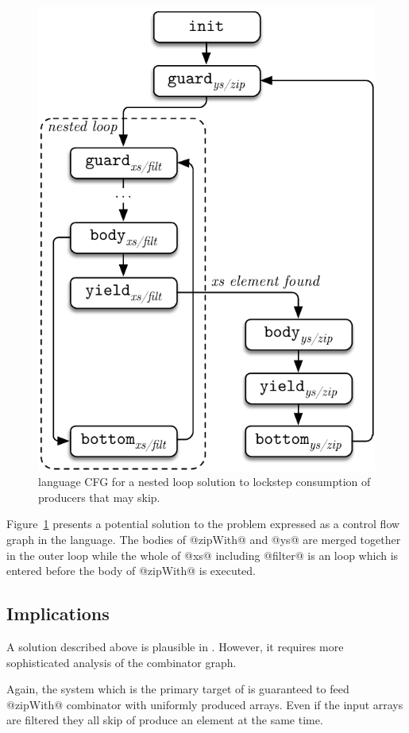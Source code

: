 \documentclass[preamble.tex]{subfiles}
\begin{document}
\begin{figure}[ht]

\includegraphics[center,scale=\omniscale]{img/CFG-ZipFilter}

\caption{\Loop language CFG for a nested loop solution to lockstep consumption of producers that may skip.}
\label{fig:CFG-zipWithFilter}
\end{figure}


Figure~\ref{fig:CFG-zipWithFilter} presents a potential solution to the problem expressed as a control flow graph in the \Loop language. The bodies of @zipWith@ and @ys@ are merged together in the outer loop while the whole of @xs@ including @filter@ is an loop which is entered before the body of @zipWith@ is executed.


\subsection{Implications}

A solution described above is plausible in \LiveFusion. However, it requires more sophisticated analysis of the combinator graph.

Again, the \DPH system which is the primary target of \LiveFusion is guaranteed to feed @zipWith@ combinator with uniformly produced arrays. Even if the input arrays are filtered they all skip of produce an element at the same time.
\end{document}
